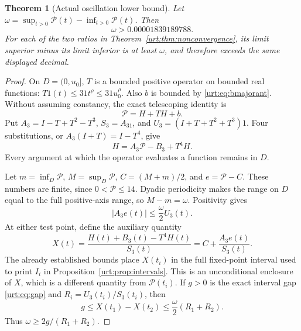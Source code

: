 \documentclass[11pt,letterpaper]{article}
\newtheorem{theorem}{Theorem}[section]
\theoremstyle{remark}\newtheorem{remark}[theorem]{Remark}
\newcommand{\Pc}{\mathcal P}\newcommand{\Bc}{\mathcal B}\newcommand{\dd}{\mathrm d}
\begin{document}
\begin{theorem}[Actual oscillation lower bound]\label{urt:thm:oscillation}
Let $\omega=\sup_{t>0}\Pc(t)-\inf_{t>0}\Pc(t)$. Then
\begin{equation}\label{urt:eq:oscillation}
 \omega>0.00001839189788.
\end{equation}
For each of the two ratios in Theorem~\ref{urt:thm:nonconvergence}, its limit superior minus its limit inferior is at least $\omega$, and therefore exceeds the same displayed decimal.
\end{theorem}
\begin{proof}
On $D=(0,u_0]$, $T$ is a bounded positive operator on bounded real functions: $T1(t)\le31t^\rho\le31u_0^\rho$. Also $b$ is bounded by \eqref{urt:eq:bmajorant}. Without assuming constancy, the exact telescoping identity is
\[
 \Pc=H+TH+b.
\]
Put $A_3=I-T+T^2-T^3$, $S_3=A_31$, and $U_3=(I+T+T^2+T^3)1$. Four substitutions, or $A_3(I+T)=I-T^4$, give
\begin{equation}\label{urt:eq:unconditionaloperator}
 H=A_3\Pc-B_3+T^4H.
\end{equation}
Every argument at which the operator evaluates a function remains in $D$.

Let $m=\inf_D\Pc$, $M=\sup_D\Pc$, $C=(M+m)/2$, and $e=\Pc-C$. These numbers are finite, since $0<\Pc\le14$. Dyadic periodicity makes the range on $D$ equal to the full positive-axis range, so $M-m=\omega$. Positivity gives
\[
 |A_3e(t)|\le\frac\omega2 U_3(t).
\]
At either test point, define the auxiliary quantity
\[
 X(t)=\frac{H(t)+B_3(t)-T^4H(t)}{S_3(t)}
     =C+\frac{A_3e(t)}{S_3(t)}.
\]
The already established bounds place $X(t_i)$ in the full fixed-point interval used to print $I_i$ in Proposition~\ref{urt:prop:intervals}. This is an unconditional enclosure of $X$, which is a different quantity from $\Pc(t_i)$. If $g>0$ is the exact interval gap \eqref{urt:eq:gap} and $R_i=U_3(t_i)/S_3(t_i)$, then
\[
 g\le X(t_1)-X(t_2)\le\frac\omega2(R_1+R_2).
\]
Thus $\omega\ge2g/(R_1+R_2)$.


\end{proof}
\end{document}
